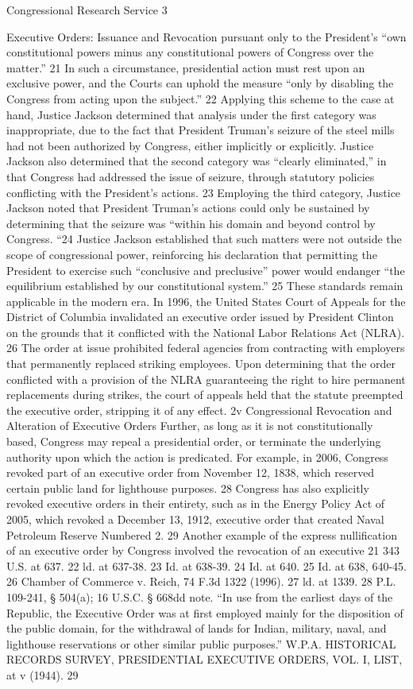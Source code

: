 \documentclass[11pt,a4paper]{article}
\begin{document}
Congressional Research Service 3

Executive Orders: Issuance and Revocation pursuant only to the President's “own constitutional powers minus any constitutional powers of Congress over the matter.” 21 In such a circumstance, presidential action must rest upon an exclusive power, and the Courts can uphold the measure “only by disabling the Congress from acting upon the subject.” 22 Applying this scheme to the case at hand, Justice Jackson determined that analysis under the first category was inappropriate, due to the fact that President Truman's seizure of the steel mills had not been authorized by Congress, either implicitly or explicitly. Justice Jackson also determined that the second category was “clearly eliminated,” in that Congress had addressed the issue of seizure, through statutory policies conflicting with the President's actions. 23 Employing the third category, Justice Jackson noted that President Truman's actions could only be sustained by determining that the seizure was “within his domain and beyond control by Congress. “24 Justice Jackson established that such matters were not outside the scope of congressional power, reinforcing his declaration that permitting the President to exercise such “conclusive and preclusive” power would endanger “the equilibrium established by our constitutional system.” 25 These standards remain applicable in the modern era. In 1996, the United States Court of Appeals for the District of Columbia invalidated an executive order issued by President Clinton on the grounds that it conflicted with the National Labor Relations Act (NLRA). 26 The order at issue prohibited federal agencies from contracting with employers that permanently replaced striking employees. Upon determining that the order conflicted with a provision of the NLRA guaranteeing the right to hire permanent replacements during strikes, the court of appeals held that the statute preempted the executive order, stripping it of any effect. 2v Congressional Revocation and Alteration of Executive Orders Further, as long as it is not constitutionally based, Congress may repeal a presidential order, or terminate the underlying authority upon which the action is predicated. For example, in 2006, Congress revoked part of an executive order from November 12, 1838, which reserved certain public land for lighthouse purposes. 28 Congress has also explicitly revoked executive orders in their entirety, such as in the Energy Policy Act of 2005, which revoked a December 13, 1912, executive order that created Naval Petroleum Reserve Numbered 2. 29 Another example of the express nullification of an executive order by Congress involved the revocation of an executive 21 343 U.S. at 637. 22 ld. at 637-38. 23 Id. at 638-39. 24 Id. at 640. 25 Id. at 638, 640-45. 26 Chamber of Commerce v. Reich, 74 F.3d 1322 (1996). 27 ld. at 1339. 28 P.L. 109-241, § 504(a); 16 U.S.C. § 668dd note. “In use from the earliest days of the Republic, the Executive Order was at first employed mainly for the disposition of the public domain, for the withdrawal of lands for Indian, military, naval, and lighthouse reservations or other similar public purposes.” W.P.A. HISTORICAL RECORDS SURVEY, PRESIDENTIAL EXECUTIVE ORDERS, VOL. I, LIST, at v (1944). 29 
\end{document}
